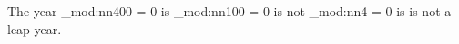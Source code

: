 \documentclass[a4paper]{article}
\begin{document}
\ExplSyntaxOn
\newcommand{\modulo}[2]{\int_mod:nn{#1}{#2}}
\ExplSyntaxOff

\newcommand\IsLeapYear[1] {
  \ifnum \modulo{#1}{400} = 0
    is%
  \else
    \ifnum \modulo{#1}{100} = 0
      is not%
    \else
      \ifnum \modulo{#1}{4} = 0
        is%
      \else
        is not%
      \fi
    \fi
  \fi
}

The year \Year \IsLeapYear{\Year} a leap year.
\end{document}
